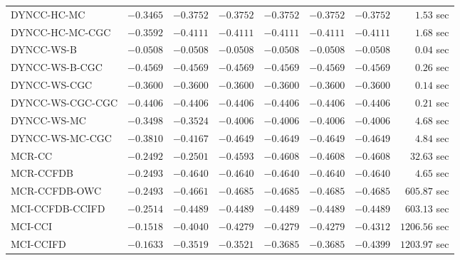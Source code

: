 \begin{table}[H]
\begin{tabular}{lrrrrrrr}
         DYNCC-HC-MC & $      -0.3465$ & $      -0.3752$ & $      -0.3752$ & $      -0.3752$ & $      -0.3752$ & $      -0.3752$ & $         1.53$ sec   \\ 
     DYNCC-HC-MC-CGC & $      -0.3592$ & $      -0.4111$ & $      -0.4111$ & $      -0.4111$ & $      -0.4111$ & $      -0.4111$ & $         1.68$ sec   \\ 
          DYNCC-WS-B & $      -0.0508$ & $      -0.0508$ & $      -0.0508$ & $      -0.0508$ & $      -0.0508$ & $      -0.0508$ & $         0.04$ sec   \\ 
      DYNCC-WS-B-CGC & $      -0.4569$ & $      -0.4569$ & $      -0.4569$ & $      -0.4569$ & $      -0.4569$ & $      -0.4569$ & $         0.26$ sec   \\ 
        DYNCC-WS-CGC & $      -0.3600$ & $      -0.3600$ & $      -0.3600$ & $      -0.3600$ & $      -0.3600$ & $      -0.3600$ & $         0.14$ sec   \\ 
    DYNCC-WS-CGC-CGC & $      -0.4406$ & $      -0.4406$ & $      -0.4406$ & $      -0.4406$ & $      -0.4406$ & $      -0.4406$ & $         0.21$ sec   \\ 
         DYNCC-WS-MC & $      -0.3498$ & $      -0.3524$ & $      -0.4006$ & $      -0.4006$ & $      -0.4006$ & $      -0.4006$ & $         4.68$ sec   \\ 
     DYNCC-WS-MC-CGC & $      -0.3810$ & $      -0.4167$ & $      -0.4649$ & $      -0.4649$ & $      -0.4649$ & $      -0.4649$ & $         4.84$ sec   \\ 
\cmidrule{1-1} 
              MCR-CC & $      -0.2492$ & $      -0.2501$ & $      -0.4593$ & $      -0.4608$ & $      -0.4608$ & $      -0.4608$ & $        32.63$ sec   \\ 
           MCR-CCFDB & $      -0.2493$ & $      -0.4640$ & $      -0.4640$ & $      -0.4640$ & $      -0.4640$ & $      -0.4640$ & $         4.65$ sec   \\ 
       MCR-CCFDB-OWC & $      -0.2493$ & $      -0.4661$ & $      -0.4685$ & $      -0.4685$ & $      -0.4685$ & $      -0.4685$ & $       605.87$ sec   \\ 
\cmidrule{1-1} 
     MCI-CCFDB-CCIFD & $      -0.2514$ & $      -0.4489$ & $      -0.4489$ & $      -0.4489$ & $      -0.4489$ & $      -0.4489$ & $       603.13$ sec   \\ 
             MCI-CCI & $      -0.1518$ & $      -0.4040$ & $      -0.4279$ & $      -0.4279$ & $      -0.4279$ & $      -0.4312$ & $      1206.56$ sec   \\ 
           MCI-CCIFD & $      -0.1633$ & $      -0.3519$ & $      -0.3521$ & $      -0.3685$ & $      -0.3685$ & $      -0.4399$ & $      1203.97$ sec   \\ 
\bottomrule
\end{tabular}
\end{table}